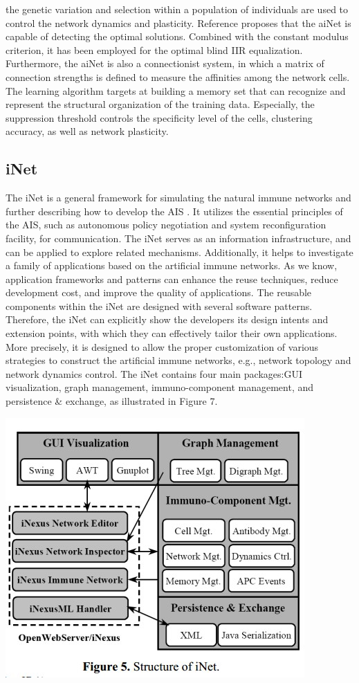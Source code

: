 \documentclass{article}
\begin{document}
the genetic variation and selection within a population of individuals are used to control the network dynamics and plasticity. Reference proposes that the aiNet is capable of
detecting the optimal solutions. Combined with the constant modulus criterion, it has been employed for the optimal blind IIR equalization. Furthermore, the aiNet is also a connectionist system, in which a matrix of connection strengths is defined to measure the affinities among the network cells. The learning algorithm targets at building a memory set that can recognize and represent the structural organization of the training data. Especially, the suppression threshold controls the specificity level of the cells, clustering accuracy, as well as network plasticity.

\subsection{iNet}
The iNet is a general framework for simulating the natural immune networks and further describing how to develop the AIS . It utilizes the essential principles of the AIS, such as autonomous policy negotiation and system reconfiguration facility, for communication. The iNet serves as an information infrastructure, and can be applied to explore related mechanisms. Additionally, it helps to investigate a family of applications based on the artificial immune networks. As we know, application frameworks and patterns can enhance the reuse techniques, reduce development cost, and improve the quality of applications. The reusable components within the iNet are
designed with several software patterns. Therefore, the iNet can explicitly show the developers its design intents and extension points, with which they can effectively tailor their own applications. More precisely, it is designed to allow the proper customization of various strategies to construct the artificial immune networks, e.g., network topology and network dynamics control. The iNet contains four main packages:GUI visualization, graph management, immuno-component management, and persistence & exchange, as illustrated in Figure 7.
    \begin{center}
    \includegraphics[width=.6\textwidth]{images/Figure_7.jpg}\\
    \end{center}
\end{document}
